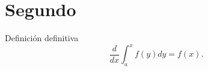\chapter{Segundo}

\lipsum[1-3]

\begin{definition}
    Definición definitiva $$\frac{d}{dx}\int_a^xf(y)dy=f(x).$$
\end{definition}
